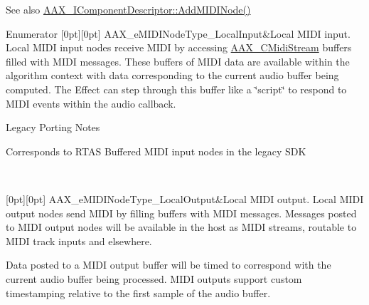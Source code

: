 \begin{DoxySeeAlso}{See also}
\mbox{\hyperlink{a01781_a6284dda9ccca898e33075de29dad4e39}{A\+A\+X\+\_\+\+I\+Component\+Descriptor\+::\+Add\+M\+I\+D\+I\+Node()}} 
\end{DoxySeeAlso}
\begin{DoxyEnumFields}{Enumerator}
[0pt][0pt]{}\mbox{\label{a00491_a5e1dffce35d05990dbbad651702678e4ae57de2b04978fe2e75f5bdeb034bda44}} 
A\+A\+X\+\_\+e\+M\+I\+D\+I\+Node\+Type\+\_\+\+Local\+Input&Local M\+I\+DI input. Local M\+I\+DI input nodes receive M\+I\+DI by accessing \mbox{\hyperlink{a01433}{A\+A\+X\+\_\+\+C\+Midi\+Stream}} buffers filled with M\+I\+DI messages. These buffers of M\+I\+DI data are available within the algorithm context with data corresponding to the current audio buffer being computed. The Effect can step through this buffer like a \char`\"{}script\char`\"{} to respond to M\+I\+DI events within the audio callback.

\begin{DoxyRefDesc}{Legacy Porting Notes}
\item[\mbox{\hyperlink{a00787__porting_notes000027}{Legacy Porting Notes}}]Corresponds to R\+T\+AS Buffered M\+I\+DI input nodes in the legacy S\+DK \end{DoxyRefDesc}
\\
\hline

[0pt][0pt]{}\mbox{\label{a00491_a5e1dffce35d05990dbbad651702678e4acc1b5f2109c508b20a65b5e0fdcd643f}} 
A\+A\+X\+\_\+e\+M\+I\+D\+I\+Node\+Type\+\_\+\+Local\+Output&Local M\+I\+DI output. Local M\+I\+DI output nodes send M\+I\+DI by filling buffers with M\+I\+DI messages. Messages posted to M\+I\+DI output nodes will be available in the host as M\+I\+DI streams, routable to M\+I\+DI track inputs and elsewhere.

Data posted to a M\+I\+DI output buffer will be timed to correspond with the current audio buffer being processed. M\+I\+DI outputs support custom timestamping relative to the first sample of the audio buffer.


\end{DoxyEnumFields}
